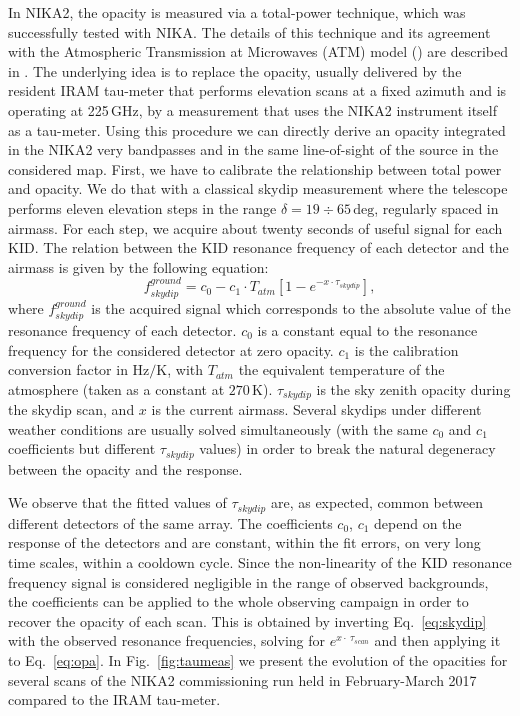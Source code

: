 \documentclass[]{aa} %
\begin{document}
In NIKA2, the opacity is measured via a total-power technique, which
was successfully tested with NIKA. The details of this technique and
its agreement with the Atmospheric Transmission at Microwaves (ATM)
model (\cite{2001IEEE....49.1683C}) are described in
\cite{Catalano2014}. The underlying idea is to replace the opacity,
usually delivered by the resident IRAM tau-meter that performs
elevation scans at a fixed azimuth and is operating at 225\,GHz, by a
measurement that uses the NIKA2 instrument itself as a tau-meter.
Using this procedure we can directly derive an opacity integrated in
the NIKA2 very bandpasses and in the same line-of-sight of the source
in the considered map. First, we have to calibrate the relationship
between total power and opacity. We do that with a classical skydip
measurement where the telescope performs eleven elevation steps in the
range $\delta = 19\div65\,\mathrm{deg}$, regularly spaced in airmass. For each
step, we acquire about twenty seconds of useful signal for each KID.
The relation between the KID resonance frequency of each detector and
the airmass is given by the following equation:
\begin{equation}\label{eq:skydip}
f^{ground}_{skydip} = c_0 - c_1 \cdot T_{atm}[1 - e^{- x \cdot \tau_{skydip}}],
\end{equation}
where $f^{ground}_{skydip}$ is the acquired signal which corresponds
to the absolute value of the resonance frequency of each detector.
$c_0$ is a constant equal to the resonance frequency for the
considered detector at zero opacity. $c_1$ is the calibration
conversion factor in $\mathrm{Hz/K}$, with $T_{atm}$ the equivalent
temperature of the atmosphere (taken as a constant at $270\,\mathrm{K}$).
$\tau_{skydip}$ is the sky zenith opacity during the skydip scan, and
$x$ is the current airmass. Several skydips under different weather
conditions are usually solved simultaneously (with the same $c_0$ and
$c_1$ coefficients but different $\tau_{skydip}$ values) in order to
break the natural degeneracy between the opacity and the response.

We observe that the fitted values of $\tau_{skydip}$ are, as expected,
common between different detectors of the same array. The coefficients
$c_0$, $c_1$ depend on the response of the detectors and are constant,
within the fit errors, on very long time scales, within a cooldown
cycle. Since the non-linearity of the KID resonance frequency signal
is considered negligible in the range of observed backgrounds, the
coefficients can be applied to the whole observing campaign in order
to recover the opacity of each scan. This is obtained by inverting
Eq.~\ref{eq:skydip} with the observed resonance frequencies, solving
for $e^{x \cdot\ \tau_{scan}}$ and then applying it to
Eq.~\ref{eq:opa}. In Fig.~\ref{fig:taumeas} we present the evolution
of the opacities for several scans of the NIKA2 commissioning run held
in February-March 2017 compared to the IRAM tau-meter.
\end{document}
